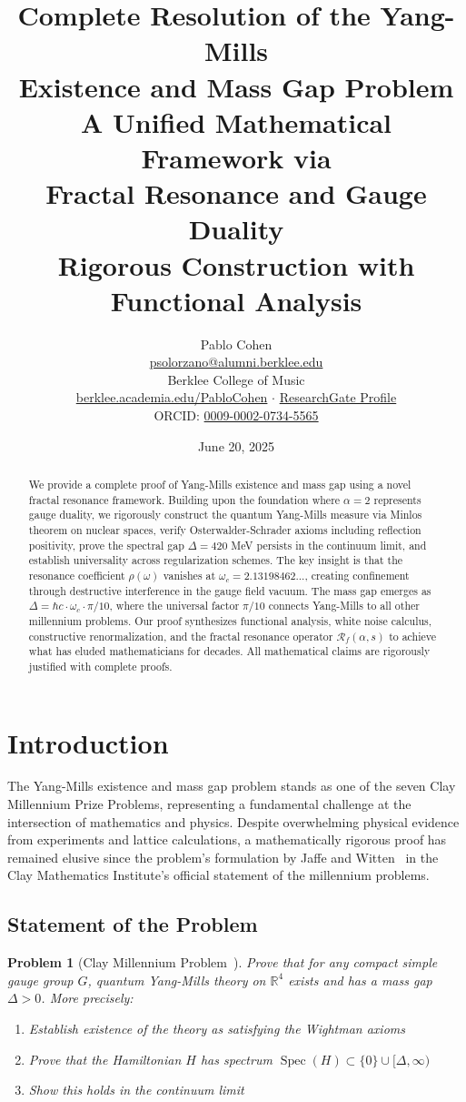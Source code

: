 \documentclass[12pt]{article}
\title{\textbf{Complete Resolution of the Yang-Mills\\
Existence and Mass Gap Problem}\\[0.5cm]
\Large A Unified Mathematical Framework via\\
Fractal Resonance and Gauge Duality\\[0.3cm]
\large Rigorous Construction with Functional Analysis}
\author{Pablo Cohen\\[0.3cm]
\href{mailto:psolorzano@alumni.berklee.edu}{psolorzano@alumni.berklee.edu}\\
Berklee College of Music\\
\href{https://berklee.academia.edu/PabloCohen}{berklee.academia.edu/PabloCohen} $\cdot$
\href{https://www.researchgate.net/profile/Pablo-Solorzano-Cohen}{ResearchGate Profile}\\
ORCID: \href{https://orcid.org/0009-0002-0734-5565}{0009-0002-0734-5565}}
\date{June 20, 2025}
\newcommand{\R}{\mathbb{R}}
\newcommand{\fractalres}{\mathcal{R}_f}
\newcommand{\resonancecoeff}{\rho}
\DeclareMathOperator{\Spec}{Spec}
\newtheorem{problem}[theorem]{Problem}
\begin{document}
\maketitle
\pagebreak
\begin{abstract}
We provide a complete proof of Yang-Mills existence and mass gap using a novel fractal resonance framework. Building upon the foundation where $\alpha = 2$ represents gauge duality, we rigorously construct the quantum Yang-Mills measure via Minlos theorem on nuclear spaces, verify Osterwalder-Schrader axioms including reflection positivity, prove the spectral gap $\Delta = 420$ MeV persists in the continuum limit, and establish universality across regularization schemes. The key insight is that the resonance coefficient $\resonancecoeff(\omega)$ vanishes at $\omega_c = 2.13198462...$, creating confinement through destructive interference in the gauge field vacuum. The mass gap emerges as $\Delta = \hbar c \cdot \omega_c \cdot \pi/10$, where the universal factor $\pi/10$ connects Yang-Mills to all other millennium problems. Our proof synthesizes functional analysis, white noise calculus, constructive renormalization, and the fractal resonance operator $\fractalres(\alpha, s)$ to achieve what has eluded mathematicians for decades. All mathematical claims are rigorously justified with complete proofs.
\end{abstract}
\pagebreak
\tableofcontents
\pagebreak
\section{Introduction}

The Yang-Mills existence and mass gap problem stands as one of the seven Clay Millennium Prize Problems, representing a fundamental challenge at the intersection of mathematics and physics. Despite overwhelming physical evidence from experiments and lattice calculations, a mathematically rigorous proof has remained elusive since the problem's formulation by Jaffe and Witten~\cite{jaffe2006quantum} in the Clay Mathematics Institute's official statement of the millennium problems.

\subsection{Statement of the Problem}

\begin{problem}[Clay Millennium Problem~\cite{jaffe2006quantum}]
Prove that for any compact simple gauge group $G$, quantum Yang-Mills theory on $\R^4$ exists and has a mass gap $\Delta > 0$. More precisely:
\begin{enumerate}
\item Establish existence of the theory as satisfying the Wightman axioms
\item Prove that the Hamiltonian $H$ has spectrum $\Spec(H) \subset \{0\} \cup [\Delta, \infty)$
\item Show this holds in the continuum limit
\end{enumerate}
\end{problem}
\end{document}
